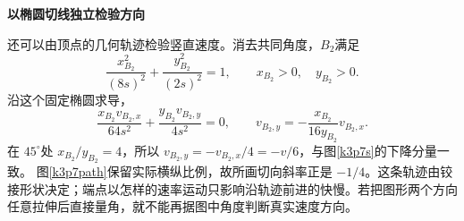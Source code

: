 \begin{solution}
\par\medskip{}\noindent\textbf{以椭圆切线独立检验方向}\par\nobreak
还可以由顶点的几何轨迹检验竖直速度。消去共同角度，$B_2$满足
\[\frac{x_{B_2}^2}{(8s)^2}+\frac{y_{B_2}^2}{(2s)^2}=1,
\qquad x_{B_2}>0,\quad y_{B_2}>0.\]
沿这个固定椭圆求导，
\[\frac{x_{B_2}v_{B_2,x}}{64s^2}
 +\frac{y_{B_2}v_{B_2,y}}{4s^2}=0,
\qquad v_{B_2,y}=-\frac{x_{B_2}}{16y_{B_2}}v_{B_2,x}.
\]
在 $45^\circ$处 $x_{B_2}/y_{B_2}=4$，所以 $v_{B_2,y}=-v_{B_2,x}/4=-v/6$，与图\ref{k3p7s}的下降分量一致。
图\ref{k3p7path}保留实际横纵比例，故所画切向斜率正是 $-1/4$。这条轨迹由铰接形状决定；端点以怎样的速率运动只影响沿轨迹前进的快慢。若把图形两个方向任意拉伸后直接量角，就不能再据图中角度判断真实速度方向。
\end{solution}

